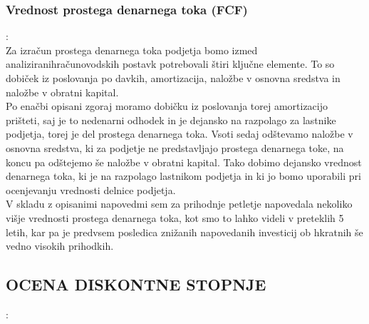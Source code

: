 \documentclass[12pt,a4paper]{amsart}
\theoremstyle{definition} %
\theoremstyle{plain} %
\begin{document}
\subsubsection{Vrednost prostega denarnega toka (FCF)}:\\

Za izračun prostega denarnega toka podjetja bomo izmed analiziranih\break računovodskih postavk potrebovali štiri ključne elemente. To so dobiček iz poslovanja po davkih, amortizacija, naložbe v osnovna sredstva in naložbe v obratni kapital. \\
Po enačbi opisani zgoraj moramo dobičku iz poslovanja torej amortizacijo prišteti, saj je to nedenarni odhodek in je dejansko na razpolago za lastnike podjetja, torej je del prostega denarnega toka. Vsoti sedaj odštevamo naložbe v osnovna sredstva, ki za podjetje ne predstavljajo prostega denarnega toke, na koncu pa odštejemo še naložbe v obratni kapital. Tako dobimo dejansko vrednost denarnega toka, ki je na razpolago lastnikom podjetja in ki jo bomo uporabili pri ocenjevanju vrednosti delnice podjetja.\\
V skladu z opisanimi napovedmi sem za prihodnje petletje napovedala nekoliko višje vrednosti prostega denarnega toka, kot smo to lahko videli v preteklih 5 letih, kar pa je predvsem posledica znižanih napovedanih investicij ob hkratnih še vedno visokih prihodkih.


\subsection{OCENA DISKONTNE STOPNJE}:\\
\end{document}
